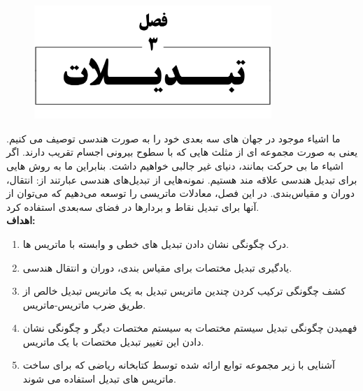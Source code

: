 \newpage

\setcounter{chapter}{3}
\setcounter{example}{0}
\setcounter{eqtn}{0}
\setcounter{section}{0}


\chapter{}
\textbf{\vspace{-140pt}}
\begin{figure}[H]
    \centering
    \setlength{\belowcaptionskip}{-10pt}
    \includegraphics[width=0.8\textwidth]{Images/4/3/4.Session.1.3.0}
    \label{fig:4.Session.1.3.0}
\end{figure}
\textbf{\vspace{20pt}}
{
    \Large
    \begin{spacing}{1.5}
        ما اشیاء موجود در جهان های سه بعدی خود را به صورت هندسی توصیف می کنیم.
        یعنی به صورت مجموعه ای از مثلث هایی که با سطوح بیرونی اجسام تقریب دارند.
        اگر اشیاء ما بی حرکت بمانند، دنیای غیر جالبی خواهیم داشت.
        بنابراین ما به روش هایی برای تبدیل هندسی علاقه مند هستیم.
        نمونه‌هایی از تبدیل‌های هندسی عبارتند از: انتقال، دوران و مقیاس‌بندی.
        در این فصل، معادلات ماتریسی را توسعه می‌دهیم که می‌توان از آنها برای تبدیل نقاط و بردارها در فضای سه‌بعدی استفاده کرد.
        \\

        \textbf{\LARGE \hspace{-40pt}اهداف:}
        \begin{enumerate}[label=\textbf{\arabic*}.]
            \item {درک چگونگی نشان دادن تبدیل های خطی و وابسته با ماتریس ها.}
            \item {یادگیری تبدیل مختصات برای مقیاس بندی، دوران و انتقال هندسی.}
            \item {کشف چگونگی ترکیب کردن چندین ماتریس تبدیل به یک ماتریس تبدیل خالص از طریق ضرب ماتریس-ماتریس.}
            \item {فهمیدن چگونگی تبدیل سیستم مختصات به سیستم مختصات دیگر و چگونگی نشان دادن این تغییر تبدیل مختصات با یک ماتریس.}
            \item {آشنایی با زیر مجموعه توابع ارائه شده توسط کتابخانه ریاضی  که برای ساخت ماتریس های تبدیل استفاده می شوند.}
        \end{enumerate}
    \end{spacing}
}
\newpage

